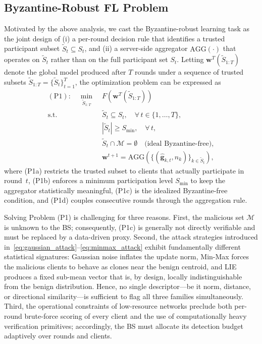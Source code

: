 \documentclass[journal]{IEEEtran}
\begin{document}
\subsection{Byzantine-Robust FL Problem}
\label{sec:p1}

Motivated by the above analysis, we cast the Byzantine-robust learning task as the joint design of (i) a per-round decision rule that identifies a trusted participant subset $\widetilde{S}_t \subseteq S_t$, and (ii) a server-side aggregator $\text{AGG}(\cdot)$ that operates on $\widetilde{S}_t$ rather than on the full participant set $S_t$. Letting $\mathbf{w}^T(\widetilde{S}_{1:T})$ denote the global model produced after $T$ rounds under a sequence of trusted subsets $\widetilde{S}_{1:T}=\{\widetilde{S}_t\}_{t=1}^{T}$, the optimization problem can be expressed as
\begin{subequations}\label{eq:p1}
\begin{align}
(\mathrm{P1}):\quad\min_{\widetilde{S}_{1:T}}\;& F\!\left(\mathbf{w}^{T}(\widetilde{S}_{1:T})\right) \label{eq:p1_obj}\\
\text{s.t.}\quad &\widetilde{S}_t \subseteq S_t,\quad \forall\,t\in\{1,\dots,T\}, \tag{P1a}\\
&|\widetilde{S}_t| \ge S_{\min},\quad \forall\,t, \tag{P1b}\\
&\widetilde{S}_t \cap \mathcal{M} = \emptyset \quad \text{(ideal Byzantine-free)}, \tag{P1c}\\
&\mathbf{w}^{t+1}=\text{AGG}\!\left(\{(\hat{\mathbf{g}}_{k,t},n_k)\}_{k\in\widetilde{S}_t}\right),\tag{P1d}
\end{align}
\end{subequations}
where (P1a) restricts the trusted subset to clients that actually participate in round~$t$, (P1b) enforces a minimum participation level $S_{\min}$ to keep the aggregator statistically meaningful, (P1c) is the idealized Byzantine-free condition, and (P1d) couples consecutive rounds through the aggregation rule.

Solving Problem (P1) is challenging for three reasons. First, the malicious set $\mathcal{M}$ is unknown to the BS; consequently, (P1c) is generally not directly verifiable and must be replaced by a data-driven proxy. Second, the attack strategies introduced in~\eqref{eq:gaussian_attack}--\eqref{eq:minmax_attack} exhibit fundamentally different statistical signatures: Gaussian noise inflates the update norm, Min-Max forces the malicious clients to behave as clones near the benign centroid, and LIE produces a fixed sub-mean vector that is, by design, locally indistinguishable from the benign distribution. Hence, no single descriptor—be it norm, distance, or directional similarity—is sufficient to flag all three families simultaneously. Third, the operational constraints of low-resource networks preclude both per-round brute-force scoring of every client and the use of computationally heavy verification primitives; accordingly, the BS must allocate its detection budget adaptively over rounds and clients.
\end{document}
